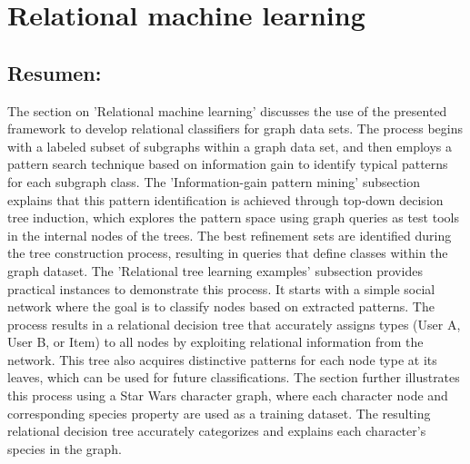 \documentclass{article}%
\begin{document}
%
\clearpage%
\section{Relational machine learning}%
\label{sec:Relationalmachinelearning}%
\subsection{Resumen:}%
\label{subsec:Resumen}%
The section on 'Relational machine learning' discusses the use of the presented framework to develop relational classifiers for graph data sets. The process begins with a labeled subset of subgraphs within a graph data set, and then employs a pattern search technique based on information gain to identify typical patterns for each subgraph class.\newline%
\newline%
The 'Information{-}gain pattern mining' subsection explains that this pattern identification is achieved through top{-}down decision tree induction, which explores the pattern space using graph queries as test tools in the internal nodes of the trees. The best refinement sets are identified during the tree construction process, resulting in queries that define classes within the graph dataset.\newline%
\newline%
The 'Relational tree learning examples' subsection provides practical instances to demonstrate this process. It starts with a simple social network where the goal is to classify nodes based on extracted patterns. The process results in a relational decision tree that accurately assigns types (User A, User B, or Item) to all nodes by exploiting relational information from the network. This tree also acquires distinctive patterns for each node type at its leaves, which can be used for future classifications.\newline%
\newline%
The section further illustrates this process using a Star Wars character graph, where each character node and corresponding species property are used as a training dataset. The resulting relational decision tree accurately categorizes and explains each character's species in the graph.

%
\end{document}
